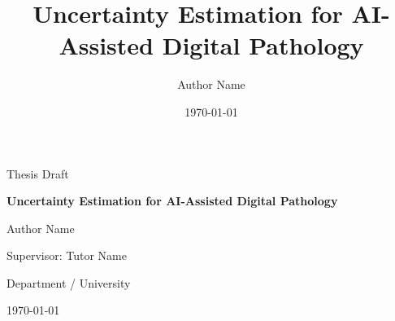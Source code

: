 \documentclass[12pt,a4paper]{report}
\title{Uncertainty Estimation for AI-Assisted Digital Pathology}
\author{Author Name}
\date{\today}
\begin{document}
\begin{titlepage}
    \centering
    {\Large Thesis Draft\par}
    \vspace{1.5cm}
    {\huge\bfseries Uncertainty Estimation for AI-Assisted Digital Pathology\par}
    \vspace{1.5cm}
    {\Large Author Name\par}
    \vspace{0.5cm}
    {\large Supervisor: Tutor Name\par}
    \vfill
    {\large Department / University\par}
    {\large \today\par}
\end{titlepage}



\tableofcontents

\clearpage







\appendix


\printbibliography[heading=bibintoc,title={Bibliography}]
\end{document}
